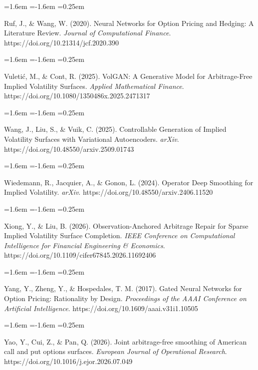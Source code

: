 \documentclass[11pt]{article}
\begin{document}
\begin{list}{}{\leftmargin=1.6em \itemindent=-1.6em \itemsep=0.25em}
\item Ruf, J., \& Wang, W. (2020). Neural Networks for Option Pricing and Hedging: A Literature Review. \textit{Journal of Computational Finance}. https://doi.org/10.21314/jcf.2020.390
\end{list}
\begin{list}{}{\leftmargin=1.6em \itemindent=-1.6em \itemsep=0.25em}
\item Vuletić, M., \& Cont, R. (2025). VolGAN: A Generative Model for Arbitrage-Free Implied Volatility Surfaces. \textit{Applied Mathematical Finance}. https://doi.org/10.1080/1350486x.2025.2471317
\end{list}
\begin{list}{}{\leftmargin=1.6em \itemindent=-1.6em \itemsep=0.25em}
\item Wang, J., Liu, S., \& Vuik, C. (2025). Controllable Generation of Implied Volatility Surfaces with Variational Autoencoders. \textit{arXiv}. https://doi.org/10.48550/arxiv.2509.01743
\end{list}
\begin{list}{}{\leftmargin=1.6em \itemindent=-1.6em \itemsep=0.25em}
\item Wiedemann, R., Jacquier, A., \& Gonon, L. (2024). Operator Deep Smoothing for Implied Volatility. \textit{arXiv}. https://doi.org/10.48550/arxiv.2406.11520
\end{list}
\begin{list}{}{\leftmargin=1.6em \itemindent=-1.6em \itemsep=0.25em}
\item Xiong, Y., \& Liu, B. (2026). Observation-Anchored Arbitrage Repair for Sparse Implied Volatility Surface Completion. \textit{IEEE Conference on Computational Intelligence for Financial Engineering \& Economics}. https://doi.org/10.1109/cifer67845.2026.11692406
\end{list}
\begin{list}{}{\leftmargin=1.6em \itemindent=-1.6em \itemsep=0.25em}
\item Yang, Y., Zheng, Y., \& Hospedales, T. M. (2017). Gated Neural Networks for Option Pricing: Rationality by Design. \textit{Proceedings of the AAAI Conference on Artificial Intelligence}. https://doi.org/10.1609/aaai.v31i1.10505
\end{list}
\begin{list}{}{\leftmargin=1.6em \itemindent=-1.6em \itemsep=0.25em}
\item Yao, Y., Cui, Z., \& Pan, Q. (2026). Joint arbitrage-free smoothing of American call and put options surfaces. \textit{European Journal of Operational Research}. https://doi.org/10.1016/j.ejor.2026.07.049
\end{list}
\end{document}
